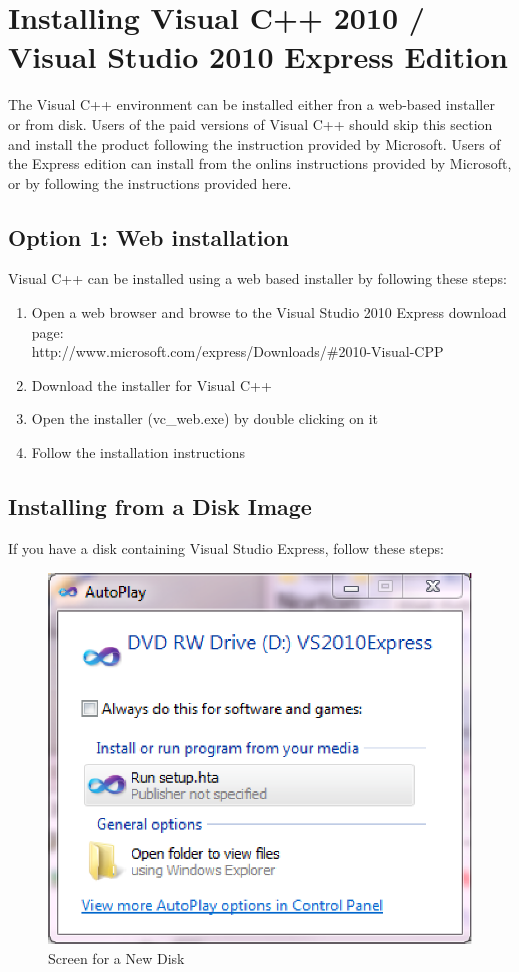 \documentclass[letterpaper,10pt]{article}%
\begin{document}
\section{Installing Visual C++ 2010 / Visual Studio 2010 Express Edition}

The Visual C++ environment can be installed either fron a web-based installer or from disk.  Users of the paid versions of Visual C++ should skip this section and install the product following the instruction provided by Microsoft.  Users of the Express edition can install from the onlins instructions provided by Microsoft, or by following the instructions provided here.

\subsection{Option 1: Web installation}

Visual C++ can be installed using a web based installer by following these steps:

\begin{enumerate}
	\item Open a web browser and browse to the Visual Studio 2010 Express download page: \\http://www.microsoft.com/express/Downloads/\#2010-Visual-CPP
	\item Download the installer for Visual C++
	\item Open the installer (vc\_web.exe) by double clicking on it
	\item Follow the installation instructions
\end{enumerate}

\subsection{Installing from a Disk Image}

If you have a disk containing Visual Studio Express, follow these steps:

\begin{figure}
\centering
\includegraphics{DiskStart.eps}
\caption{Screen for a New Disk}
\label{fig:DiskStart}
\end{figure}
\end{document}
